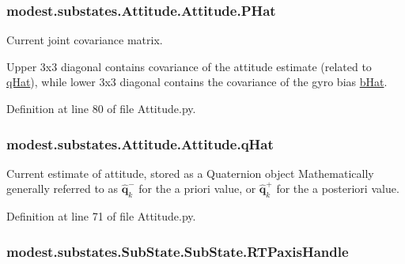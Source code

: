 \subsubsection[{\texorpdfstring{P\+Hat}{PHat}}]{\setlength{\rightskip}{0pt plus 5cm}modest.\+substates.\+Attitude.\+Attitude.\+P\+Hat}\hypertarget{classmodest_1_1substates_1_1Attitude_1_1Attitude_a3a3498c5c9f162d42d8f7f0ab9c04f0d}{}\label{classmodest_1_1substates_1_1Attitude_1_1Attitude_a3a3498c5c9f162d42d8f7f0ab9c04f0d}


Current joint covariance matrix. 

Upper 3x3 diagonal contains covariance of the attitude estimate (related to \hyperlink{classmodest_1_1substates_1_1Attitude_1_1Attitude_abdea9adf61992e689fe851e213d63c92}{q\+Hat}), while lower 3x3 diagonal contains the covariance of the gyro bias \hyperlink{classmodest_1_1substates_1_1Attitude_1_1Attitude_a7d5607d83aae16c591f5b4f6da9cb9c0}{b\+Hat}. 

Definition at line 80 of file Attitude.\+py.

\subsubsection[{\texorpdfstring{q\+Hat}{qHat}}]{\setlength{\rightskip}{0pt plus 5cm}modest.\+substates.\+Attitude.\+Attitude.\+q\+Hat}\hypertarget{classmodest_1_1substates_1_1Attitude_1_1Attitude_abdea9adf61992e689fe851e213d63c92}{}\label{classmodest_1_1substates_1_1Attitude_1_1Attitude_abdea9adf61992e689fe851e213d63c92}


Current estimate of attitude, stored as a Quaternion object Mathematically generally referred to as $\mathbf{\hat{q}}^{-}_{k}$ for the a priori value, or $\mathbf{\hat{q}}^{+}_{k}$ for the a posteriori value. 



Definition at line 71 of file Attitude.\+py.

\subsubsection[{\texorpdfstring{R\+T\+Paxis\+Handle}{RTPaxisHandle}}]{\setlength{\rightskip}{0pt plus 5cm}modest.\+substates.\+Sub\+State.\+Sub\+State.\+R\+T\+Paxis\+Handle\hspace{0.3cm}{\ttfamily [inherited]}}\hypertarget{classmodest_1_1substates_1_1SubState_1_1SubState_a914ef37afe2f8ab5c2ee9a6f4d898553}{}\label{classmodest_1_1substates_1_1SubState_1_1SubState_a914ef37afe2f8ab5c2ee9a6f4d898553}


